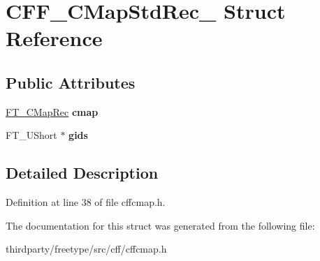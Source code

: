 \hypertarget{struct_c_f_f___c_map_std_rec__}{}\section{C\+F\+F\+\_\+\+C\+Map\+Std\+Rec\+\_\+ Struct Reference}
\label{struct_c_f_f___c_map_std_rec__}
\subsection*{Public Attributes}
\begin{DoxyCompactItemize}
\item 
\mbox{\label{struct_c_f_f___c_map_std_rec___ac6d3f72081f23021a7bc1786a33bf53a}} 
\hyperlink{struct_f_t___c_map_rec__}{F\+T\+\_\+\+C\+Map\+Rec} {\bfseries cmap}
\item 
\mbox{\label{struct_c_f_f___c_map_std_rec___a3ed3062bdd37dc60c7d9621c2d6e84d8}} 
F\+T\+\_\+\+U\+Short $\ast$ {\bfseries gids}
\end{DoxyCompactItemize}


\subsection{Detailed Description}


Definition at line 38 of file cffcmap.\+h.



The documentation for this struct was generated from the following file\+:\begin{DoxyCompactItemize}
\item 
thirdparty/freetype/src/cff/cffcmap.\+h\end{DoxyCompactItemize}
